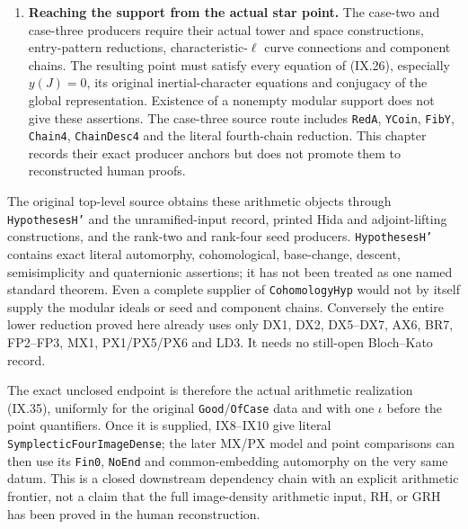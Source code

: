 \begin{enumerate}
\item \textbf{Reaching the support from the actual star point.}
The case-two and case-three producers require
their actual tower and space constructions,
entry-pattern reductions, characteristic-$\ell$
curve connections and component chains.
The resulting point must satisfy every equation
of (IX.26), especially $y(J)=0$, its original
inertial-character equations and conjugacy of the
global representation.  Existence of a nonempty
modular support does not give these assertions.
The case-three source route includes
\texttt{RedA}, \texttt{YCoin}, \texttt{FibY},
\texttt{Chain4}, \texttt{ChainDesc4} and
the literal fourth-chain reduction.  This chapter records their
exact producer anchors but does not promote them
to reconstructed human proofs.
\end{enumerate}

The original top-level source obtains these
arithmetic objects through \texttt{HypothesesH'}
and the unramified-input record, printed Hida and
adjoint-lifting constructions, and the rank-two
and rank-four seed producers.
\texttt{HypothesesH'} contains exact literal
automorphy, cohomological, base-change, descent,
semisimplicity and quaternionic assertions; it
has not been treated as one named standard
theorem.  Even a complete supplier of
\texttt{CohomologyHyp} would not by itself supply
the modular ideals or seed and component chains.
Conversely the entire lower reduction proved
here already uses only DX1, DX2, DX5--DX7,
AX6, BR7, FP2--FP3, MX1, PX1/PX5/PX6 and LD3.
It needs no still-open Bloch--Kato record.

The exact unclosed endpoint is therefore the
actual arithmetic realization (IX.35), uniformly
for the original \texttt{Good}/\texttt{OfCase}
data and with one $\iota$ before the point
quantifiers.  Once it is supplied, IX8--IX10
give literal \texttt{SymplecticFourImageDense};
the later MX/PX model and point comparisons can
then use its \texttt{Fin0}, \texttt{NoEnd} and
common-embedding automorphy on the very same
datum.  This is a closed downstream dependency
chain with an explicit arithmetic frontier,
not a claim that the full image-density
arithmetic input, RH, or GRH has been proved
in the human reconstruction.
